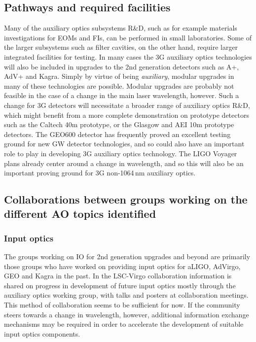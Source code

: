\subsection{Pathways and required facilities}
Many of the auxiliary optics subsystems R\&D, such as for example materials investigations for EOMs and FIs, can be performed in small laboratories. 
Some of the larger subsystems such as filter cavities, on the other hand, require larger integrated facilities for testing. In many cases the 3G auxiliary optics technologies will also be included in upgrades to the 2nd generation detectors such as A+, AdV+ and Kagra. Simply by virtue of being \emph{auxiliary}, modular upgrades in many of these technologies are possible. Modular upgrades are probably not feasible in the case of a change in the main laser wavelength, however. Such a change for 3G detectors will necessitate a broader range of auxiliary optics R\&D, which might benefit from a more complete demonstration on prototype detectors such as the Caltech 40m prototype, or the Glasgow and AEI 10m prototype detectors. The GEO600 detector has frequently proved an excellent testing ground for new GW detector technologies, and so could also have an important role to play in developing 3G auxiliary optics technology. The LIGO Voyager plans already center around a change in wavelength, and so this will also be an important proving ground for 3G non-1064\,nm auxiliary optics.

\subsection{Collaborations between groups working on the different AO topics identified}
\subsubsection{\bf Input optics} The groups working on IO for 2nd generation upgrades and beyond are primarily those groups who have worked on providing input optics for aLIGO, AdVirgo, GEO and Kagra in the past. In the LSC-Virgo collaboration information is shared on progress in development of future input optics mostly through the auxiliary optics working group, with talks and posters at collaboration meetings. This method of collaboration seems to be sufficient for now. If the community steers towards a change in wavelength, however, additional information exchange mechanisms may be required in order to accelerate the development of suitable input optics components.

